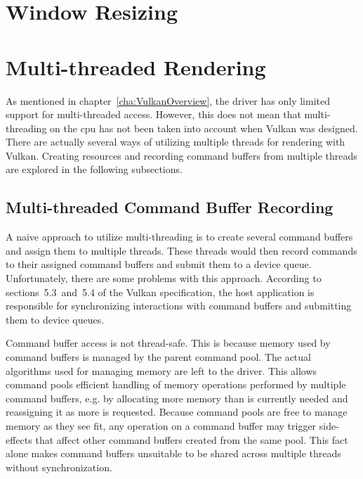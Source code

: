   \section{Window Resizing}
    \tbd

  \section{Multi-threaded Rendering}
  \label{sec:MultithreadedRendering}
    As mentioned in chapter~\ref{cha:VulkanOverview}, the \gls{driver} has only limited support for multi-threaded access.
    However, this does not mean that multi-threading on the \gls{cpu} has not been taken into account when Vulkan was designed.
    There are actually several ways of utilizing multiple threads for rendering with Vulkan.
    Creating resources and recording command buffers from multiple threads are explored in the following subsections.

    \subsection{Multi-threaded Command Buffer Recording}
      A naive approach to utilize multi-threading is to create several command buffers and assign them to multiple threads.
      These threads would then record commands to their assigned command buffers and submit them to a device queue.
      Unfortunately, there are some problems with this approach.
      According to sections~5.3~and~5.4 of the Vulkan specification\cite{vkspec}, the host application is responsible for synchronizing interactions with command buffers and submitting them to device queues.

      Command buffer access is not thread-safe.
      This is because memory used by command buffers is managed by the parent command pool.
      The actual algorithms used for managing memory are left to the \gls{driver}.
      This allows command pools efficient handling of memory operations performed by multiple command buffers, e.g. by allocating more memory than is currently needed and reassigning it as more is requested.
      Because command pools are free to manage memory as they see fit, any operation on a command buffer may trigger side-effects that affect other command buffers created from the same pool.
      This fact alone makes command buffers unsuitable to be shared across multiple threads without synchronization.

